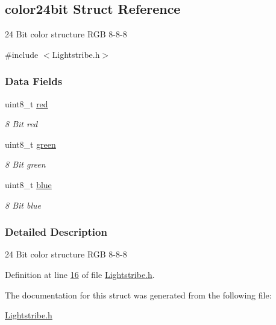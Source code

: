 \hypertarget{structcolor24bit}{}\subsection{color24bit Struct Reference}
\label{structcolor24bit}


24 Bit color structure R\+G\+B 8-\/8-\/8  




{\ttfamily \#include $<$Lightstribe.\+h$>$}

\subsubsection*{Data Fields}
\begin{DoxyCompactItemize}
\item 
\hypertarget{structcolor24bit_ad47d918910aaa51c73160ac85999d09c}{}uint8\+\_\+t \hyperlink{structcolor24bit_ad47d918910aaa51c73160ac85999d09c}{red}\label{structcolor24bit_ad47d918910aaa51c73160ac85999d09c}

\begin{DoxyCompactList}\small\item\em 8 Bit red \end{DoxyCompactList}\item 
\hypertarget{structcolor24bit_a90d21fa503b626c00cdc8d94863d5877}{}uint8\+\_\+t \hyperlink{structcolor24bit_a90d21fa503b626c00cdc8d94863d5877}{green}\label{structcolor24bit_a90d21fa503b626c00cdc8d94863d5877}

\begin{DoxyCompactList}\small\item\em 8 Bit green \end{DoxyCompactList}\item 
\hypertarget{structcolor24bit_a287b397e90d7b995c81ff54e741f96b2}{}uint8\+\_\+t \hyperlink{structcolor24bit_a287b397e90d7b995c81ff54e741f96b2}{blue}\label{structcolor24bit_a287b397e90d7b995c81ff54e741f96b2}

\begin{DoxyCompactList}\small\item\em 8 Bit blue \end{DoxyCompactList}\end{DoxyCompactItemize}


\subsubsection{Detailed Description}
24 Bit color structure R\+G\+B 8-\/8-\/8 

Definition at line \hyperlink{_lightstribe_8h_source_l00016}{16} of file \hyperlink{_lightstribe_8h_source}{Lightstribe.\+h}.



The documentation for this struct was generated from the following file\+:\begin{DoxyCompactItemize}
\item 
\hyperlink{_lightstribe_8h}{Lightstribe.\+h}\end{DoxyCompactItemize}
